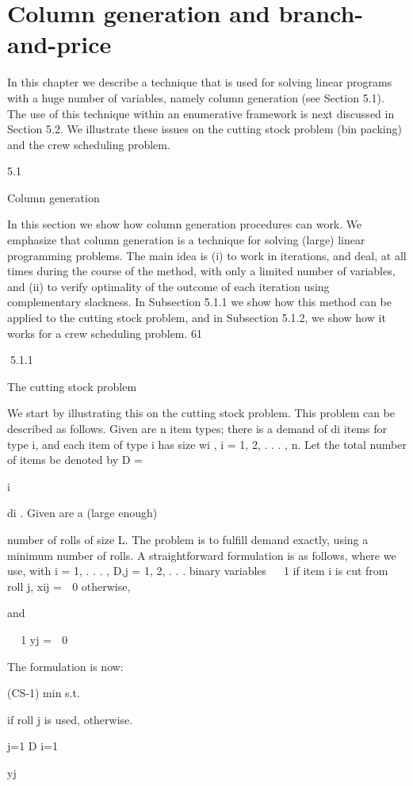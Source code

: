 \chapter{Column generation and branch-and-price}

In this chapter we describe a technique that is used for solving linear programs with a huge number of
variables, namely column generation (see Section 5.1). The use of this technique within an enumerative
framework is next discussed in Section 5.2. We illustrate these issues on the cutting stock problem (bin
packing) and the crew scheduling problem.

5.1

Column generation

In this section we show how column generation procedures can work. We emphasize that column generation is a technique for solving (large) linear programming problems. The main idea is (i) to work in
iterations, and deal, at all times during the course of the method, with only a limited number of variables,
and (ii) to verify optimality of the outcome of each iteration using complementary slackness. In Subsection 5.1.1 we show how this method can be applied to the cutting stock problem, and in Subsection 5.1.2,
we show how it works for a crew scheduling problem.
61

5.1.1

The cutting stock problem

We start by illustrating this on the cutting stock problem. This problem can be described as follows.
Given are n item types; there is a demand of di items for type i, and each item of type i has size wi ,
i = 1, 2, . . . , n. Let the total number of items be denoted by D =

i

di . Given are a (large enough)

number of rolls of size L. The problem is to fulfill demand exactly, using a minimum number of rolls. A
straightforward formulation is as follows, where we use, with i = 1, . . . , D,j = 1, 2, . . . binary variables

 1 if item i is cut from roll j,
xij =
 0 otherwise,

and


 1
yj =
 0

The formulation is now:

(CS-1) min
s.t.

if roll j is used,
otherwise.

j=1
D
i=1

yj

